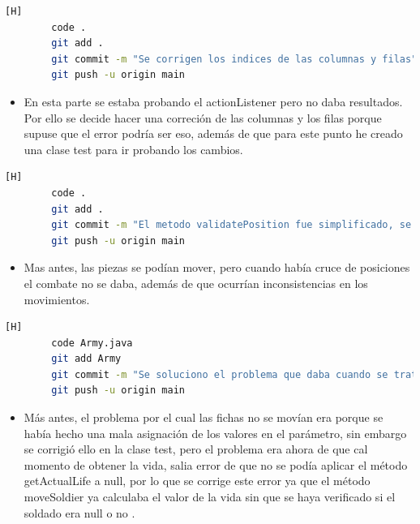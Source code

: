 \documentclass{article}
\begin{document}
	
	
	
	\begin{lstlisting}[language=bash,caption={Commit: 2f268b1e4b76f0adde845e61dc72a38a5b7107b3 }][H]
		code .
		git add .
		git commit -m "Se corrigen los indices de las columnas y filas"			
		git push -u origin main
	\end{lstlisting}

	\begin{itemize}
		\item En esta parte se estaba probando el actionListener pero no daba resultados. Por ello se decide hacer una correción de las columnas y los filas porque supuse que el error podría ser eso, además de que para este punto he creado una clase test para ir probando los cambios.
	\end{itemize}
	
	
	
	\begin{lstlisting}[language=bash,caption={Commit: 05b7ac04e84b96874123f30d29b229f4ea125ad6 }][H]
		code .
		git add .
		git commit -m "El metodo validatePosition fue simplificado, se hizo un test pero a pesar de que las coordenadas que se mandan don correctas, las fichas no se mueven"			
		git push -u origin main
	\end{lstlisting}
	
	
	\begin{itemize}
		\item Mas antes, las piezas se podían mover, pero cuando había cruce de posiciones el combate no se daba, además de que ocurrían inconsistencias en los movimientos.
	\end{itemize}
	
	
	
	
	\begin{lstlisting}[language=bash,caption={Commit: 660f38ab7ff35142fcdbf634f4a7c4179a6d63bb }][H]
		code Army.java
		git add Army
		git commit -m "Se soluciono el problema que daba cuando se trataba de obtener los puntos de vida"			
		git push -u origin main
	\end{lstlisting}
	
	
	\begin{itemize}
		\item Más antes, el problema por el cual las fichas no se movían era porque se había hecho una mala asignación de los valores en el parámetro, sin embargo se corrigió ello en la clase test, pero el problema era ahora de que cal momento de obtener la vida, salia error de que no se podía aplicar el método getActualLife a null, por lo que se corrige este error ya que el método moveSoldier ya calculaba el valor de la vida sin que se haya verificado si el soldado era null o no .
	\end{itemize}
	
\end{document}

